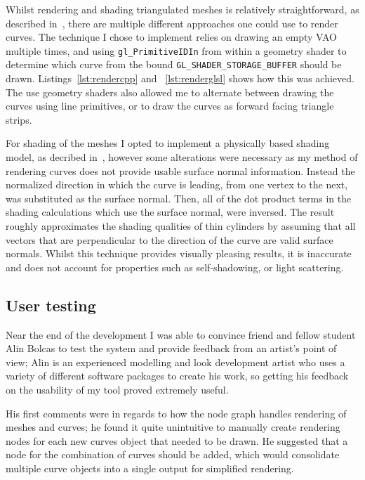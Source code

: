 \documentclass[]{acmsiggraph}
\begin{document}
Whilst rendering and shading triangulated meshes is relatively straightforward, as described in~\cite{objLoading}, there are multiple different approaches one could use to render curves. The technique I chose to implement relies on drawing an empty VAO multiple times, and using \texttt{gl\_PrimitiveIDIn} from within a geometry shader to determine which curve from the bound \texttt{GL\_SHADER\_STORAGE\_BUFFER} should be drawn. Listings~\ref{lst:rendercpp} and ~\ref{lst:renderglsl} shows how this was achieved. The use geometry shaders also allowed me to alternate between drawing the curves using line primitives, or to draw the curves as forward facing triangle strips. %

For shading of the meshes I opted to implement a physically based shading model, as decribed in~\cite{learnPBR}, however some alterations were necessary as my method of rendering curves does not provide usable surface normal information. Instead the normalized direction in which the curve is leading, from one vertex to the next, was substituted as the surface normal. Then, all of the dot product terms in the shading calculations which use the surface normal, were inversed. The result roughly approximates the shading qualities of thin cylinders by assuming that all vectors that are perpendicular to the direction of the curve are valid surface normals. Whilst this technique provides visually pleasing results, it is inaccurate and does not account for properties such as self-shadowing, or light scattering.


\subsection{User testing} \label{sec:usertesting}
Near the end of the development I was able to convince friend and fellow student Alin Bolcas to test the system and provide feedback from an artist's point of view; Alin is an experienced modelling and look development artist who uses a variety of different software packages to create his work, so getting his feedback on the usability of my tool proved extremely useful.

His first comments were in regards to how the node graph handles rendering of meshes and curves; he found it quite unintuitive to manually create rendering nodes for each new curves object that needed to be drawn. He suggested that a node for the combination of curves should be added, which would consolidate multiple curve objects into a single output for simplified rendering.
\end{document}

